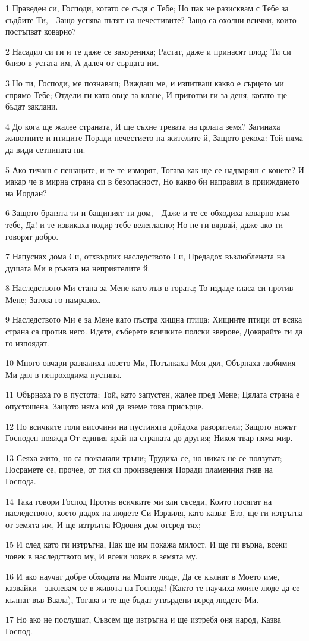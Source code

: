 \par 1 Праведен си, Господи, когато се съдя с Тебе; Но пак не разисквам с Тебе за съдбите Ти, - Защо успява пътят на нечестивите? Защо са охолни всички, които постъпват коварно?
\par 2 Насадил си ги и те даже се закорениха; Растат, даже и принасят плод; Ти си близо в устата им, А далеч от сърцата им.
\par 3 Но ти, Господи, ме познаваш; Виждаш ме, и изпитваш какво е сърцето ми спрямо Тебе; Отдели ги като овце за клане, И приготви ги за деня, когато ще бъдат заклани.
\par 4 До кога ще жалее страната, И ще съхне тревата на цялата земя? Загинаха животните и птиците Поради нечестието на жителите й, Защото рекоха: Той няма да види сетнината ни.
\par 5 Ако тичаш с пешаците, и те те изморят, Тогава как ще се надваряш с конете? И макар че в мирна страна си в безопасност, Но какво би направил в прииждането на Иордан?
\par 6 Защото братята ти и бащиният ти дом, - Даже и те се обходиха коварно към тебе, Да! и те извикаха подир тебе велегласно; Но не ги вярвай, даже ако ти говорят добро.
\par 7 Напуснах дома Си, отхвърлих наследството Си, Предадох възлюблената на душата Ми в ръката на неприятелите й.
\par 8 Наследството Ми стана за Мене като лъв в гората; То издаде гласа си против Мене; Затова го намразих.
\par 9 Наследството Ми е за Мене като пъстра хищна птица; Хищните птици от всяка страна са против него. Идете, съберете всичките полски зверове, Докарайте ги да го изпоядат.
\par 10 Много овчари развалиха лозето Ми, Потъпкаха Моя дял, Обърнаха любимия Ми дял в непроходима пустиня.
\par 11 Обърнаха го в пустота; Той, като запустен, жалее пред Мене; Цялата страна е опустошена, Защото няма кой да вземе това присърце.
\par 12 По всичките голи височини на пустинята дойдоха разорители; Защото ножът Господен пояжда От единия край на страната до другия; Никоя твар няма мир.
\par 13 Сеяха жито, но са пожънали тръни; Трудиха се, но никак не се ползуват; Посрамете се, прочее, от тия си произведения Поради пламенния гняв на Господа.
\par 14 Така говори Господ Против всичките ми зли съседи, Които посягат на наследството, което дадох на людете Си Израиля, като казва: Ето, ще ги изтръгна от земята им, И ще изтръгна Юдовия дом отсред тях;
\par 15 И след като ги изтръгна, Пак ще им покажа милост, И ще ги върна, всеки човек в наследството му, И всеки човек в земята му.
\par 16 И ако научат добре обходата на Моите люде, Да се кълнат в Моето име, казвайки - заклевам се в живота на Господа! (Както те научиха моите люде да се кълнат във Ваала), Тогава и те ще бъдат утвърдени всред людете Ми.
\par 17 Но ако не послушат, Съвсем ще изтръгна и ще изтребя оня народ, Казва Господ.

